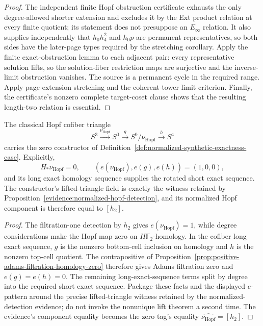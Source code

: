 \begin{proof}
  The independent finite Hopf obstruction certificate exhausts the only
  degree-allowed shorter extension and excludes it by the Ext product relation
  at every finite quotient; its statement does not presuppose an
  $E_\infty$ relation.  It also supplies independently that
  $h_0h_4^2$ and $h_0p$ are permanent representatives, so both sides have the
  later-page types required by the stretching corollary.  Apply the finite
  exact-obstruction lemma to each adjacent pair:
  every representative solution lifts, so the solution-fiber restriction maps
  are surjective and the inverse-limit obstruction vanishes.  The source is a
  permanent cycle in the required range.  Apply page-extension stretching and
  the coherent-tower limit criterion.  Finally, the certificate's nonzero
  complete target-coset clause shows that the resulting length-two relation is
  essential.
\end{proof}

\begin{lemma}
  \label{lem:normalized-hopf-exactness-case}
  \notready
  The classical Hopf cofiber triangle
  \[
    S^3\xrightarrow{\nu_{\mathrm{Hopf}}}S^0\xrightarrow g
    S^0/\nu_{\mathrm{Hopf}}\xrightarrow hS^4
  \]
  carries the zero constructor of
  Definition~\ref{def:normalized-synthetic-exactness-case}.  Explicitly,
  \[
    H_*\nu_{\mathrm{Hopf}}=0,
    \qquad
    (e(\nu_{\mathrm{Hopf}}),e(g),e(h))=(1,0,0),
  \]
  and its long exact homology sequence supplies the rotated short exact
  sequence.  The constructor's lifted-triangle field is exactly the witness
  retained by Proposition~\ref{evidence:normalized-hopf-detection}, and its
  normalized Hopf component is therefore equal to $[h_2]$.
\end{lemma}

\begin{proof}
  The filtration-one detection by $h_2$ gives
  $e(\nu_{\mathrm{Hopf}})=1$, while degree considerations make the Hopf map
  zero on $H\mathbb F_2$-homology.  In the cofiber long exact sequence, $g$
  is the nonzero bottom-cell inclusion on homology and $h$ is the nonzero
  top-cell quotient.  The contrapositive of
  Proposition~\ref{prop:positive-adams-filtration-homology-zero} therefore
  gives Adams filtration zero and $e(g)=e(h)=0$.  The remaining
  long-exact-sequence terms split by degree into
  the required short exact sequence.  Package these facts and the displayed
  $e$-pattern around the precise lifted-triangle witness retained by the
  normalized-detection evidence; do not invoke the nonunique lift theorem a
  second time.  The evidence's component equality becomes the zero tag's
  equality $\widehat{\nu_{\mathrm{Hopf}}}=[h_2]$.
\end{proof}
